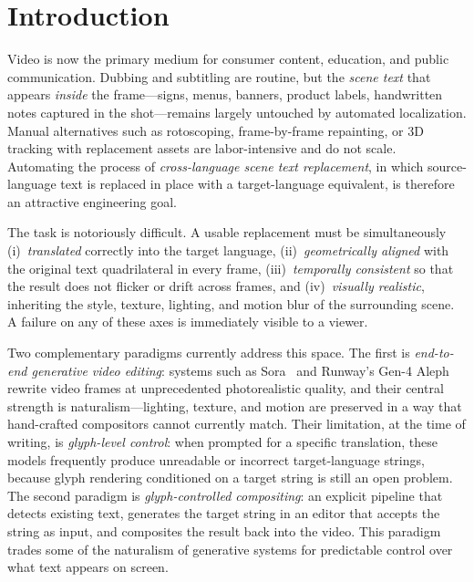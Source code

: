 \section{Introduction}
\label{sec:introduction}

Video is now the primary medium for consumer content, education,
and public communication. Dubbing and subtitling are routine, but
the \emph{scene text} that appears \emph{inside} the frame---signs,
menus, banners, product labels, handwritten notes captured in the
shot---remains largely untouched by automated localization. Manual
alternatives such as rotoscoping, frame-by-frame repainting, or
3D tracking with replacement assets are labor-intensive and do not
scale. Automating the process of \emph{cross-language scene text
replacement}, in which source-language text is replaced in place with
a target-language equivalent, is therefore an attractive engineering
goal.

The task is notoriously difficult. A usable replacement must be
simultaneously (i)~\emph{translated} correctly into the target
language, (ii)~\emph{geometrically aligned} with the original text
quadrilateral in every frame, (iii)~\emph{temporally consistent} so
that the result does not flicker or drift across frames, and
(iv)~\emph{visually realistic}, inheriting the style, texture,
lighting, and motion blur of the surrounding scene. A failure on any
of these axes is immediately visible to a viewer.

Two complementary paradigms currently address this space. The first
is \emph{end-to-end generative video editing}: systems such as
Sora~\citep{openai2024sora} and Runway's Gen-4 Aleph~\citep{runway2025aleph}
rewrite video frames at unprecedented photorealistic quality, and
their central strength is naturalism---lighting, texture, and motion
are preserved in a way that hand-crafted compositors cannot currently
match. Their limitation, at the time of writing, is \emph{glyph-level
control}: when prompted for a specific translation, these models
frequently produce unreadable or incorrect target-language strings,
because glyph rendering conditioned on a target string is still an
open problem. The second paradigm is
\emph{glyph-controlled compositing}: an explicit pipeline that
detects existing text, generates the target string in an editor that
accepts the string as input, and composites the result back into the
video. This paradigm trades some of the naturalism of generative
systems for predictable control over what text appears on screen.

